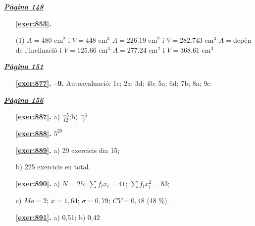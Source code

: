 
\hyperlink{page.148}{\textbf{\em Pàgina 148}}
\begin{enumerate}



 \item[\fontfamily{phv}\selectfont\color{blue}\textbf{\ref{exer:853}. }] \label{ans:853}
 \begin{tasks}[column-sep=1em, item-indent=1.3333em](1)
	 \task* $A=480$ cm$^2$ i $V=448$ cm$^3$
	 \task* $A=226.19$ cm$^2$ i $V=282.743$ cm$^3$
	 \task* $A=$depèn de l'inclinació i $V=125.66$ cm$^3$
	 \task* $A=277.24$ cm$^2$ i $V=368.61$ cm$^3$
\end{tasks}
 \end{enumerate}
\vspace{0.3cm}


\hyperlink{page.151}{\textbf{\em Pàgina 151}}
\begin{enumerate}
\item[\fontfamily{phv}\selectfont\color{blue}\textbf{\ref{exer:877}. }] \label{ans:877} 
\textbf {--9.} Autoavaluació: 1c; 2a; 3d; 4b; 5a; 6d; 7b; 8a; 9c.
 \end{enumerate}

 \vspace{1cm} 
 

\vspace{0.3cm}


\hyperlink{page.156}{\textbf{\em Pàgina 156}}
\begin{enumerate}
\item[\fontfamily{phv}\selectfont\color{blue}\textbf{\ref{exer:887}. }] \label{ans:887} 
 a) $\frac {-5}{12}$;\quad b) $\frac {-3}{7}$
 \end{enumerate}
\begin{enumerate}
\item[\fontfamily{phv}\selectfont\color{blue}\textbf{\ref{exer:888}. }] \label{ans:888} 
 $5^{20}$
\item[\fontfamily{phv}\selectfont\color{blue}\textbf{\ref{exer:889}. }] \label{ans:889} 
a) 29 exercicis dia 15; \par b) 225 exercicis en total.
\item[\fontfamily{phv}\selectfont\color{blue}\textbf{\ref{exer:890}. }] \label{ans:890} 
 a) $N=25$; $\sum f_i x_i = 41$; $\sum f_i x_i^2 =83$;\par c) $Mo=2$; $\bar x=1,64$; $\sigma =0,79$; $CV=0,48$ (48 \%).
\item[\fontfamily{phv}\selectfont\color{blue}\textbf{\ref{exer:891}. }] \label{ans:891} 
 a) 0,51; b) 0,42
 \end{enumerate}
\vspace{0.3cm}

